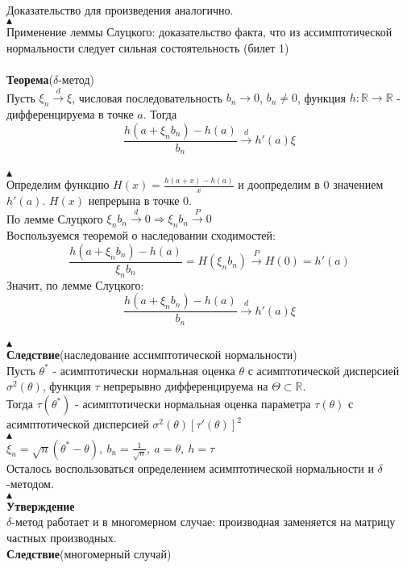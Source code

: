 \documentclass[25pt]{article}
\begin{document}
\\
Доказательство для произведения аналогично.\\
$\blacktriangle$
\\
Применение леммы Слуцкого: доказательство факта, что из ассимптотической нормальности следует сильная состоятельность (билет 1)
\\ \\ 
\textbf{Теорема}($\delta$-метод)\\
Пусть $\xi_n \xrightarrow{d} \xi$, числовая последовательность $b_n \rightarrow 0$, $b_n \neq 0$, функция $h: \mathbb{R} \rightarrow \mathbb{R}$ - дифференцируема в точке $a$. Тогда
$$ \frac{h(a + \xi_n b_n) - h(a)}{b_n} \xrightarrow{d} h'(a)\xi$$ 
\\
$\blacktriangle$
\\
Определим функцию $H(x) = \frac{h(a + x) - h(a)}{x}$ и доопределим в 0 значением $h'(a)$. $H(x)$ непрерына в точке 0.
\\
По лемме Слуцкого $\xi_n b_n \xrightarrow{d} 0 \Rightarrow \xi_n b_n \xrightarrow{P} 0$
\\
Воспользуемся теоремой о наследовании сходимостей:
$$ \frac{h(a + \xi_n b_n) - h(a)}{\xi_n b_n} = H(\xi_n b_n) \xrightarrow{P} H(0) = h'(a) $$
Значит, по лемме Слуцкого:
$$ \frac{h(a + \xi_n b_n) - h(a)}{b_n} \xrightarrow{d} h'(a)\xi $$
\\
$\blacktriangle$
\\
\textbf{Следствие}(наследование ассимптотической нормальности)\\
Пусть $\theta^*$ - асимптотически нормальная оценка $\theta$ с асимптотической дисперсией $\sigma^2(\theta)$,
функция $\tau$ непрерывно дифференцируема на $\Theta \subset \mathbb{R}$.\\
Тогда $\tau(\theta^*)$ - асимптотически нормальная оценка параметра $\tau(\theta)$ с асимптотической дисперсией $\sigma^2(\theta)[\tau'(\theta)]^2$
\\
$\blacktriangle$
\\
$\xi_n = \sqrt{n}(\theta^* - \theta),\ b_n = \frac{1}{\sqrt{n}},\ a = \theta,\ h = \tau$\\
Осталось воспользоваться определением асимптотической нормальности и $\delta$-методом.
\\
$\blacktriangle$
\\
\textbf{Утверждение}\\
$\delta$-метод работает и в многомерном случае: производная заменяется на матрицу частных производных.\\
\textbf{Следствие}(многомерный случай)\\
\end{document}
